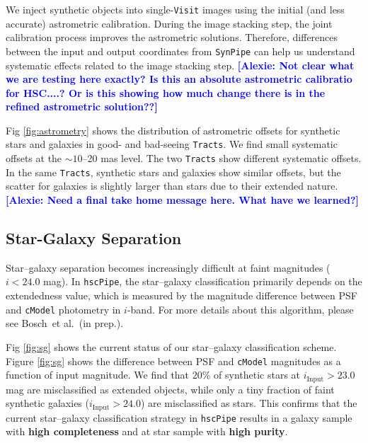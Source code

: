 \documentclass[useamsfonts]{pasj01}
\def\etal{{\ et al.~}}
\newcommand{\alexie}[1]{\textcolor{blue}{\textbf{[Alexie: #1]}}}
\def\hscpipe{\texttt{hscPipe}}
\def\synpipe{\texttt{SynPipe}}
\def\cmodel{\texttt{cModel}}
\def\visit{\texttt{Visit}}
\def\tracts{\texttt{Tracts}}
\begin{document}
    We inject synthetic objects into single-\visit{} images using the initial (and less accurate) astrometric calibration.
    During the image stacking step, the joint calibration process improves the
    astrometric solutions.
    Therefore, differences between the input and output coordinates from \synpipe{}
    can help us understand systematic effects related to the image stacking step. \alexie{Not clear what we are testing here exactly? Is this an absolute astrometric calibratio for HSC....? Or is this showing how much change there is in the refined astrometric solution??}

    Fig \ref{fig:astrometry} shows the distribution of astrometric offsets for synthetic stars and galaxies in good- and bad-seeing \tracts{}.
    We find small systematic offsets at the ${\sim}10$--20 mas level.
    The two \tracts{} show different systematic offsets.
    In the same \tracts{}, synthetic stars and galaxies show similar offsets, but the scatter for galaxies is slightly larger than stars due to their extended nature. \alexie{Need a final take home message here. What have we learned?}

\subsection{Star-Galaxy Separation}
    \label{ssec:sg}

    Star--galaxy separation becomes increasingly difficult at faint magnitudes ($i<24.0$ mag).
    In \hscpipe{}, the star--galaxy classification primarily depends on the 
    extendedness value, which is measured by the magnitude difference between PSF and 
    \cmodel{} photometry in $i$-band.
    For more details about this algorithm, please see Bosch\etal (in prep.).

    Fig \ref{fig:sg} shows the current status of our star--galaxy classification scheme.  Figure  \ref{fig:sg} shows the difference between PSF and \cmodel{}
    magnitudes as a function of  input magnitude. We find that $20$\% of synthetic stars at $i_{\mathrm{Input}}>23.0$ mag are misclassified as extended objects, while only a tiny fraction of faint synthetic galaxies ($i_{\mathrm{Input}}>24.0$) are
    misclassified as stars. This confirms that the current star--galaxy classification strategy in \hscpipe{}
    results in a galaxy sample with \textbf{high completeness} and at star sample
    with \textbf{high purity}.
\end{document}
